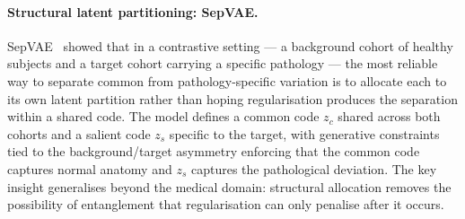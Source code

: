 \paragraph{Structural latent partitioning: SepVAE.}
SepVAE~\citep{louiset2024sepvae} showed that in a contrastive setting --- a background
cohort of healthy subjects and a target cohort carrying a specific pathology --- the most
reliable way to separate common from pathology-specific variation is to allocate each to
its own latent partition rather than hoping regularisation produces the separation within a
shared code. The model defines a common code $z_c$ shared across both cohorts and a
salient code $z_s$ specific to the target, with generative constraints tied to the
background/target asymmetry enforcing that the common code captures normal anatomy and
$z_s$ captures the pathological deviation. The key insight generalises beyond the medical
domain: structural allocation removes the possibility of entanglement that regularisation
can only penalise after it occurs.
